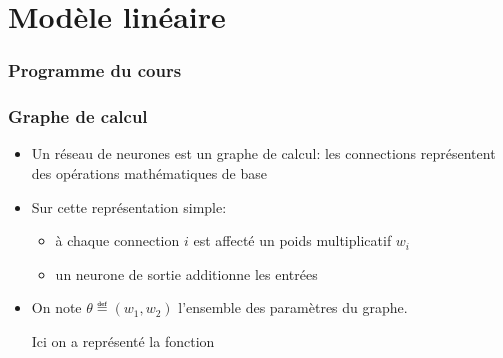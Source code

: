 \documentclass[9pt,table]{beamer} %
\begin{document}
\section{Modèle linéaire}

\begin{frame}
\frametitle{Programme du cours}
\tableofcontents[currentsection]
\end{frame}


\begin{frame}
\frametitle{Graphe de calcul}

\begin{itemize}[label=\tiny$\blacksquare$]
	\item Un réseau de neurones est un \alert{graphe de calcul}: les connections représentent des opérations mathématiques de base
\end{itemize}

\begin{center}
\end{center}

\begin{itemize}[label=\tiny$\blacksquare$]
	\item Sur cette représentation simple:
	\begin{itemize}[label=-]
		\item à chaque \alert{connection} ${i}$ est affecté un \alert{poids} multiplicatif $w_i$
		\item un neurone de sortie \alert{additionne} les entrées
	\end{itemize}
	
	\pause
	
	\item On note \alert{$\theta \eqdef (w_1,w_2)$} l'ensemble des paramètres du graphe. 
	
	Ici on a représenté la fonction
\end{itemize}


\end{frame}
\end{document}
